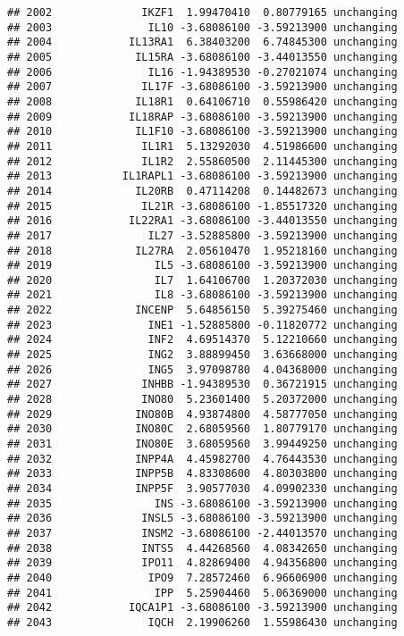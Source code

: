 \documentclass[]{article}
\begin{document}
\begin{verbatim}
## 2002              IKZF1  1.99470410  0.80779165 unchanging
## 2003               IL10 -3.68086100 -3.59213900 unchanging
## 2004            IL13RA1  6.38403200  6.74845300 unchanging
## 2005             IL15RA -3.68086100 -3.44013550 unchanging
## 2006               IL16 -1.94389530 -0.27021074 unchanging
## 2007              IL17F -3.68086100 -3.59213900 unchanging
## 2008             IL18R1  0.64106710  0.55986420 unchanging
## 2009            IL18RAP -3.68086100 -3.59213900 unchanging
## 2010             IL1F10 -3.68086100 -3.59213900 unchanging
## 2011              IL1R1  5.13292030  4.51986600 unchanging
## 2012              IL1R2  2.55860500  2.11445300 unchanging
## 2013           IL1RAPL1 -3.68086100 -3.59213900 unchanging
## 2014             IL20RB  0.47114208  0.14482673 unchanging
## 2015              IL21R -3.68086100 -1.85517320 unchanging
## 2016            IL22RA1 -3.68086100 -3.44013550 unchanging
## 2017               IL27 -3.52885800 -3.59213900 unchanging
## 2018             IL27RA  2.05610470  1.95218160 unchanging
## 2019                IL5 -3.68086100 -3.59213900 unchanging
## 2020                IL7  1.64106700  1.20372030 unchanging
## 2021                IL8 -3.68086100 -3.59213900 unchanging
## 2022             INCENP  5.64856150  5.39275460 unchanging
## 2023               INE1 -1.52885800 -0.11820772 unchanging
## 2024               INF2  4.69514370  5.12210660 unchanging
## 2025               ING2  3.88899450  3.63668000 unchanging
## 2026               ING5  3.97098780  4.04368000 unchanging
## 2027              INHBB -1.94389530  0.36721915 unchanging
## 2028              INO80  5.23601400  5.20372000 unchanging
## 2029             INO80B  4.93874800  4.58777050 unchanging
## 2030             INO80C  2.68059560  1.80779170 unchanging
## 2031             INO80E  3.68059560  3.99449250 unchanging
## 2032             INPP4A  4.45982700  4.76443530 unchanging
## 2033             INPP5B  4.83308600  4.80303800 unchanging
## 2034             INPP5F  3.90577030  4.09902330 unchanging
## 2035                INS -3.68086100 -3.59213900 unchanging
## 2036              INSL5 -3.68086100 -3.59213900 unchanging
## 2037              INSM2 -3.68086100 -2.44013570 unchanging
## 2038              INTS5  4.44268560  4.08342650 unchanging
## 2039              IPO11  4.82869400  4.94356800 unchanging
## 2040               IPO9  7.28572460  6.96606900 unchanging
## 2041                IPP  5.25904460  5.06369000 unchanging
## 2042            IQCA1P1 -3.68086100 -3.59213900 unchanging
## 2043               IQCH  2.19906260  1.55986430 unchanging

\end{verbatim}
\end{document}
